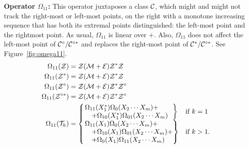 \documentclass[12pt, a4paper, twoside]{report}
\begin{document}
\noindent\textbf{Operator $\Omega_{11}$:}
This operator juxtaposes a class $\mathcal{C}$, which might and might not track the right-most or left-most points, on the right with a monotone increasing sequence that has both its extremal points distinguished: the left-most point and the rightmost point. As usual, $\Omega_{11}$ is linear over $+$. Also, $\Omega_{11}$ does not affect the left-most point of $\mathcal{C}^\circ/\mathcal{C}^{\circ*}$ and replaces the right-most point of $\mathcal{C}^*/\mathcal{C}^{\circ*}$. See Figure~\ref{fig:omega11}.
\begin{align}
  \begin{aligned}
  \Omega_{11}(\Z) &= \Z(\M+\EE)\Z^*\Z\\
  \Omega_{11}(\Z^*) &= \Z(\M+\EE)\Z^*\Z\\
  \Omega_{11}(\Z^\circ) &= \Z(\M+\EE)\Z^*\Z^\circ\\
  \Omega_{11}(\Z^{\circ*}) &= \Z(\M+\EE)\Z^*\Z^\circ\\
  \Omega_{11}(\T_h) &=
  \begin{cases}
    \begin{rcases}
      \Omega_{11}(X_1^*)\Omega_0(X_2\cdots X_m)+\ \ \ \\
      \quad+\Omega_{10}(X_1^*)\Omega_{01}(X_2\cdots X_m)\ \ 
    \end{rcases} &\text{if $k = 1$}\\
    \begin{rcases}
      \Omega_{11}(X_1)\Omega_0(X_2\cdots X_m) +\\
      \quad+\Omega_{10}(X_1)\Omega_{01}(X_2\cdots X_m) +\\
      \quad+\Omega_0(X_1)\Omega_{11}(X_2\cdots X_m)
    \end{rcases} &\text{if $k>1$.}
  \end{cases}
\end{aligned}
                   \label{eq:iterjuxt_def_omega11}
\end{align}
\end{document}
